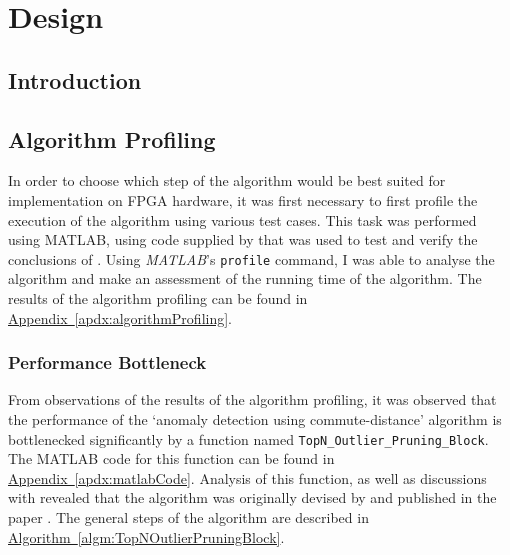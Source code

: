 \chapter{Design}
\label{ch:design}

\section{Introduction}
\label{sec:designIntroduction}

\section{Algorithm Profiling}
\label{sec:algorithmProfiling}
In order to choose which step of the algorithm would be best suited for 
implementation on FPGA hardware, it was first necessary to first profile the 
execution of the algorithm using various test cases. This task was performed 
using MATLAB, using code supplied by \citeauthor{Khoa:2012} that was used to 
test and verify the conclusions of . Using \emph{MATLAB}'s 
\verb+profile+ command, I was able to analyse the algorithm and make an 
assessment of the running time of the algorithm. The results of the algorithm 
profiling can be found in 
\hyperref[apdx:algorithmProfiling]{Appendix~\ref{apdx:algorithmProfiling}}. 

\subsection{Performance Bottleneck}
\label{sec:algorithmPerformanceBottleneck}
From observations of the results of the algorithm profiling, it was observed 
that the performance of the `anomaly detection using commute-distance' 
algorithm is bottlenecked significantly by a function named 
\verb+TopN_Outlier_Pruning_Block+. The MATLAB code for this function can be 
found in \hyperref[apdx:matlabCode]{Appendix~\ref{apdx:matlabCode}}. Analysis of
this function, as well as discussions with \citeauthor{Khoa:2012} revealed that
the algorithm was originally devised by \citeauthor{Bay:2003} and published in
the paper . The general steps of the algorithm are described
in \hyperref[algm:TopNOutlierPruningBlock]
{Algorithm~\ref{algm:TopNOutlierPruningBlock}}.

